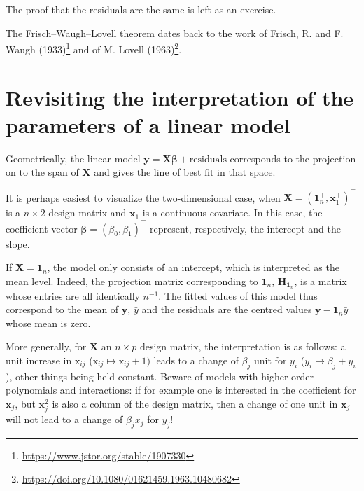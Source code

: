 \documentclass[]{book}
\let\rmarkdownfootnote\footnote%
\def\footnote{\protect\rmarkdownfootnote}
\renewcommand{\href}[2]{#2\footnote{\url{#1}}}
\theoremstyle{definition}
\theoremstyle{definition}
\theoremstyle{definition}
\theoremstyle{remark}
\begin{document}
The proof that the residuals are the same is left as an exercise.

The Frisch--Waugh--Lovell theorem dates back to the work of
\href{https://www.jstor.org/stable/1907330}{Frisch, R. and F. Waugh
(1933)} and of \href{https://doi.org/10.1080/01621459.1963.10480682}{M.
Lovell (1963)}.

\hypertarget{revisiting-the-interpretation-of-the-parameters-of-a-linear-model}{%
\section{Revisiting the interpretation of the parameters of a linear
model}\label{revisiting-the-interpretation-of-the-parameters-of-a-linear-model}}

Geometrically, the linear model
\(\boldsymbol{y} = \mathbf{X} \boldsymbol{\beta} + \text{residuals}\)
corresponds to the projection on to the span of \(\mathbf{X}\) and gives
the line of best fit in that space.

It is perhaps easiest to visualize the two-dimensional case, when
\(\mathbf{X} = (\mathbf{1}_n^\top, \mathbf{x}_1^\top)^\top\) is a
\(n \times 2\) design matrix and \(\mathbf{x}_1\) is a continuous
covariate. In this case, the coefficient vector
\(\boldsymbol{\beta}=(\beta_0, \beta_1)^\top\) represent, respectively,
the intercept and the slope.

If \(\mathbf{X} = \mathbf{1}_n\), the model only consists of an
intercept, which is interpreted as the mean level. Indeed, the
projection matrix corresponding to \(\mathbf{1}_n\),
\(\mathbf{H}_{\mathbf{1}_n}\), is a matrix whose entries are all
identically \(n^{-1}\). The fitted values of this model thus correspond
to the mean of \(\boldsymbol{y}\), \(\bar{y}\) and the residuals are the
centred values \(\boldsymbol{y}-\mathbf{1}_n \bar{y}\) whose mean is
zero.

More generally, for \(\mathbf{X}\) an \(n \times p\) design matrix, the
interpretation is as follows: a unit increase in \(\mathrm{x}_{ij}\)
(\(\mathrm{x}_{ij} \mapsto \mathrm{x}_{ij}+1)\) leads to a change of
\(\beta_j\) unit for \(y_i\) (\(y_i \mapsto \beta_j+y_i\)), other things
being held constant. Beware of models with higher order polynomials and
interactions: if for example one is interested in the coefficient for
\(\mathbf{x}_j\), but \(\mathbf{x}_j^2\) is also a column of the design
matrix, then a change of one unit in \(\mathbf{x}_j\) will not lead to a
change of \(\beta_jx_j\) for \(y_j\)!
\end{document}

